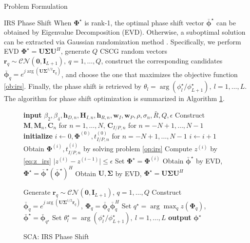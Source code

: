 \documentclass[journal]{IEEEtran}
\begin{document}
\begin{section}{Problem Formulation}
\begin{subsection}{IRS Phase Shift}
			When $\boldsymbol{\Phi}^{\star}$ is rank-1, the optimal phase shift vector $\bar{\boldsymbol{\phi}}^\star$ can be obtained by Eigenvalue Decomposition (EVD). Otherwise, a suboptimal solution can be extracted via Gaussian randomization method \cite{Huang2010}. Specifically, we perform EVD $\boldsymbol{\Phi}^{\star}=\boldsymbol{U}\boldsymbol{\Sigma}\boldsymbol{U}^H$, generate $Q$ CSCG random vectors $\boldsymbol{r}_q \sim \mathcal{CN}(\boldsymbol{0},\boldsymbol{I}_{L+1}),\ q=1,\dots,Q$, construct the corresponding candidates $\bar{\boldsymbol{\phi}}_q=e^{j\arg\left(\boldsymbol{U}\boldsymbol{\Sigma}^{1/2}\boldsymbol{r}_q\right)}$, and choose the one that maximizes the objective function \ref{ob:irs}. Finally, the phase shift is retrieved by $\theta_l=\arg(\phi_l^\star/\phi_{L+1}^\star), \ l=1,\dots,L$. The algorithm for phase shift optimization is summarized in Algorithm \ref{al:irs}.
			\begin{figure}[!t]
				\forcealgorithm
				\begin{algorithm}[H]
					\caption{SCA: IRS Phase Shift}
					\label{al:irs}
					\begin{algorithmic}[1]
						\State \textbf{input} $\beta_2,\beta_4,\boldsymbol{h}_{D,n},\boldsymbol{H}_{I,n},\boldsymbol{h}_{R,n},\boldsymbol{w}_I,\boldsymbol{w}_P,\rho,\sigma_n,\bar{R},Q,\epsilon$
						\State Construct $\boldsymbol{M},\boldsymbol{M}_n,\boldsymbol{C}_{n}$ for $n=1,\dots,N$, $\boldsymbol{C}_{I/P,n}$ for $n=-N+1,\dots,N-1$
						\State \textbf{initialize} $i \gets 0,\boldsymbol{\Phi}^{(0)},t_{I/P,n}^{(0)}$ for $n=-N+1,\dots,N-1$
						\Repeat
							\State $i \gets i + 1$
							\State Obtain $\boldsymbol{\Phi}^{(i)}, t_{I/P,n}^{(i)}$ by solving problem \ref{op:irs}
							\State Compute $z^{(i)}$ by \ref{eq:z_irs}
						\Until $\lvert z^{(i)}-z^{(i-1)} \rvert \le \epsilon$
						\State Set $\boldsymbol{\Phi}^{\star}=\boldsymbol{\Phi}^{(i)}$
							\State Obtain $\bar{\boldsymbol{\phi}}^\star$ by EVD, $\boldsymbol{\Phi}^{\star}=\bar{\boldsymbol{\phi}}^\star(\bar{\boldsymbol{\phi}}^\star)^H$
						\Else
							\State Obtain $\boldsymbol{U},\boldsymbol{\Sigma}$ by EVD, $\boldsymbol{\Phi}^{\star}=\boldsymbol{U}\boldsymbol{\Sigma}\boldsymbol{U}^H$

							\State Generate $\boldsymbol{r}_q \sim \mathcal{CN}(\boldsymbol{0},\boldsymbol{I}_{L+1})$, $q=1,\dots,Q$
							\State Construct $\bar{\boldsymbol{\phi}}_q=e^{j\arg\left(\boldsymbol{U}\boldsymbol{\Sigma}^{1/2}\boldsymbol{r}_q\right)}$, $\boldsymbol{\Phi}_q=\bar{\boldsymbol{\phi}}_q\bar{\boldsymbol{\phi}}_q^H$
							\State Set $q^{\star}=\arg\max_q{z(\boldsymbol{\Phi}_q)}$, $\bar{\boldsymbol{\phi}}^\star=\bar{\boldsymbol{\phi}}_{q^{\star}}$
						\EndIf
						\State Set $\theta_l^\star=\arg(\phi_l^\star/\phi_{L+1}^\star), \ l=1,\dots,L$
						\State \textbf{output} $\boldsymbol{\phi}^{\star}$
					\end{algorithmic}
				\end{algorithm}
			\end{figure}
		\end{subsection}



\end{section}
\end{document}
